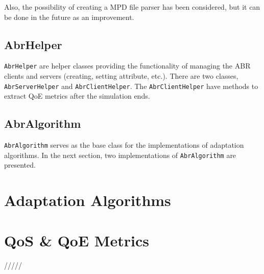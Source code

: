 Also, the possibility of 
creating a MPD file parser has been considered, but it can be done in the future as an improvement.

\subsection{AbrHelper}

\texttt{AbrHelper} are helper classes providing the functionality of managing the ABR clients and 
servers (creating, setting attribute, etc.). There are two classes, \texttt{AbrServerHelper}
and \texttt{AbrClientHelper}. The \texttt{AbrClientHelper} have methods to extract QoE metrics 
after the simulation ends.

\subsection{AbrAlgorithm}

\texttt{AbrAlgorithm} serves as the base class for the implementations of adaptation algorithms.
In the next section, two implementations of \texttt{AbrAlgorithm} are presented.

\section{Adaptation Algorithms}
\label{sec:abralgo}




\section{QoS \& QoE Metrics}

/////


